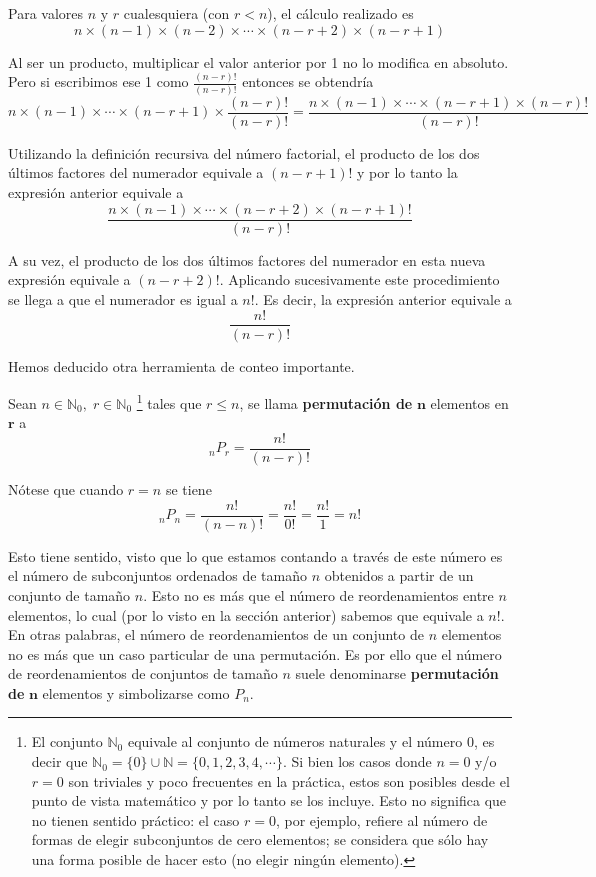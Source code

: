 \documentclass[
  letterpaper,
  DIV=11,
  numbers=noendperiod]{scrreprt}
\begin{document}
Para valores \(n\) y \(r\) cualesquiera (con \(r<n\)), el cálculo
realizado es
\[n \times (n-1) \times (n-2) \times \cdots \times (n-r+2) \times (n-r+1)\]

Al ser un producto, multiplicar el valor anterior por 1 no lo modifica
en absoluto. Pero si escribimos ese 1 como
\(\textstyle\frac{(n-r)!}{(n-r)!}\) entonces se obtendría
\[n \times (n-1) \times \cdots \times (n-r+1) \times \frac{(n-r)!}{(n-r)!} = \frac{n \times (n-1) \times \cdots \times (n-r+1) \times (n-r)!}{(n-r)!}\]

Utilizando la definición recursiva del número factorial, el producto de
los dos últimos factores del numerador equivale a \((n-r+1)!\) y por lo
tanto la expresión anterior equivale a
\[\frac{n \times (n-1) \times \cdots \times (n-r+2) \times (n-r+1)!}{(n-r)!}\]

A su vez, el producto de los dos últimos factores del numerador en esta
nueva expresión equivale a \((n-r+2)!\). Aplicando sucesivamente este
procedimiento se llega a que el numerador es igual a \(n!\). Es decir,
la expresión anterior equivale a \[\frac{n!}{(n-r)!}\]

Hemos deducido otra herramienta de conteo importante.

Sean \(n \in \mathbb{N}_0, \; r \in \mathbb{N}_0\) \footnote{El conjunto
  \(\mathbb{N}_0\) equivale al conjunto de números naturales y el número
  0, es decir que
  \(\mathbb{N}_0 = \{0\} \cup \mathbb{N} = \{ 0,1,2,3,4,\cdots \}\). Si
  bien los casos donde \(n=0\) y/o \(r=0\) son triviales y poco
  frecuentes en la práctica, estos son posibles desde el punto de vista
  matemático y por lo tanto se los incluye. Esto no significa que no
  tienen sentido práctico: el caso \(r=0\), por ejemplo, refiere al
  número de formas de elegir subconjuntos de cero elementos; se
  considera que sólo hay una forma posible de hacer esto (no elegir
  ningún elemento).} tales que \(r \leq n\), se llama
\textbf{permutación de} \(\mathbf{n}\) elementos en \(\mathbf{r}\) a
\[_nP_r = \frac{n!}{(n-r)!}\]

Nótese que cuando \(r=n\) se tiene
\[_nP_n = \frac{n!}{(n-n)!} = \frac{n!}{0!} = \frac{n!}{1} = n!\]

Esto tiene sentido, visto que lo que estamos contando a través de este
número es el número de subconjuntos ordenados de tamaño \(n\) obtenidos
a partir de un conjunto de tamaño \(n\). Esto no es más que el número de
reordenamientos entre \(n\) elementos, lo cual (por lo visto en la
sección anterior) sabemos que equivale a \(n!\). En otras palabras, el
número de reordenamientos de un conjunto de \(n\) elementos no es más
que un caso particular de una permutación. Es por ello que el número de
reordenamientos de conjuntos de tamaño \(n\) suele denominarse
\textbf{permutación de} \(\mathbf{n}\) elementos y simbolizarse como
\(P_n\).
\end{document}

